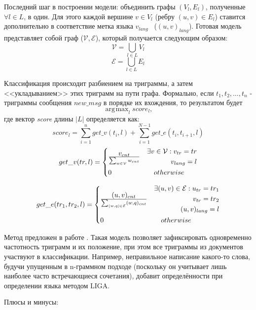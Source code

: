 \documentclass[a4paper, 14pt]{article}
\DeclareMathOperator*{\argmax}{\arg\!\max}
\begin{document}
		Последний шаг в построении модели: объединить графы $(V_{l}, E_{l})$, полученные $\forall l \in L$, в один. 
		Для этого каждой вершине $v \in V_{l}$
		(ребру $(u, v) \in E_{l}$) ставится дополнительно в соответствие метка языка $v_{lang}$ \ ($(u, v)_{lang}$). 
		Готовая модель представляет собой граф
		($\mathcal{V}, \mathcal{E}$), который получается следующим образом:
		$$ \mathcal{V} = \bigcup_{l \in L} V_{l}$$
		$$ \mathcal{E} = \bigcup_{l \in L} E_{l}$$
		
		Классификация происходит разбиением на триграммы, а затем <<укладыванием>> этих триграмм на пути графа. Формально, если
		$t_{1}, t_{2}, \ldots, t_{n}$ - триграммы сообщения $new\_msg$ в порядке их вхождения, то результатом будет
		$$ \argmax_{l} score_{l} ,$$
		где вектор \textit{score} длины $|L|$ определяется как:
		$$ score_{l} = \sum_{i=1}^{n} get\_v(t_{i}, l) + \sum_{i=1}^{N-1} get\_e(t_{i}, t_{i+1}, l)$$
		\[
 		get\_v(tr, l) =
 		  \begin{dcases}
  		   v_{cnt} \over \sum_{w \in \mathcal{V}} w_{cnt} & 
  		   \begin{split} 
					 \exists v \in \mathcal{V}: v_{tr}=tr \\ v_{lang}=l	
  		   	\end{split} \\
  		   0 & \quad otherwise
  		 \end{dcases}
		\]		
		
		\[
 		get\_e(tr_1, tr_2, l) =
 		  \begin{dcases}
  		   (u, v)_{cnt} \over \sum_{(w, q) \in \mathcal{E}} (w, q)_{cnt} & 
  		    \begin{split} 
					 \exists (u, v) \in \mathcal{E}:  u_{tr}=tr_1 \\ v_{tr}=tr_2 \\ (u, v)_{lang}=l
  		   	\end{split} \\
  		   0 & \quad otherwise
  		 \end{dcases}
		\]	
		
		Метод предложен в работе \cite{liga}. Такая модель позволяет зафиксировать одновременно частотность триграмм и их положение, при этом все триграммы
		из документов участвуют в классификации. Например, неправильное написание какого-то слова, будучи упущенным в n-граммном подходе (поскольку он
		учитывает лишь наиболее часто встречающиеся сочетания), добавит определённости при определении языка методом LIGA.		
		
		\noindent Плюсы и минусы:
		
\end{document}
